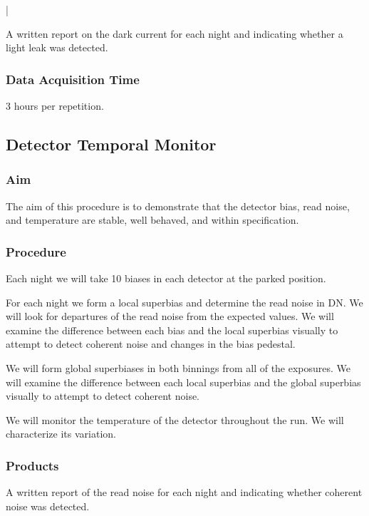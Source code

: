 |\documentclass{article}
\begin{document}
A written report on the dark current for each night and indicating whether a light leak was detected.

\subsubsection{Data Acquisition Time}

3 hours per repetition.


\subsection{Detector Temporal Monitor}

\subsubsection{Aim}

The aim of this procedure is to demonstrate that the detector bias, read noise, and temperature are stable, well behaved, and within specification.

\subsubsection{Procedure}

Each night we will take 10 biases in each detector at the parked position.

For each night we form a local superbias and determine the read noise in DN. We will look for departures of the read noise from the expected values. We will examine the difference between each bias and the local superbias visually to attempt to detect coherent noise and changes in the bias pedestal.

We will form global superbiases in both binnings from all of the exposures. We will examine the difference between each local superbias and the global superbias visually to attempt to detect coherent noise.

We will monitor the temperature of the detector throughout the run. We will characterize its variation.

\subsubsection{Products}

A written report of the read noise for each night and indicating whether coherent noise was detected.
\end{document}
